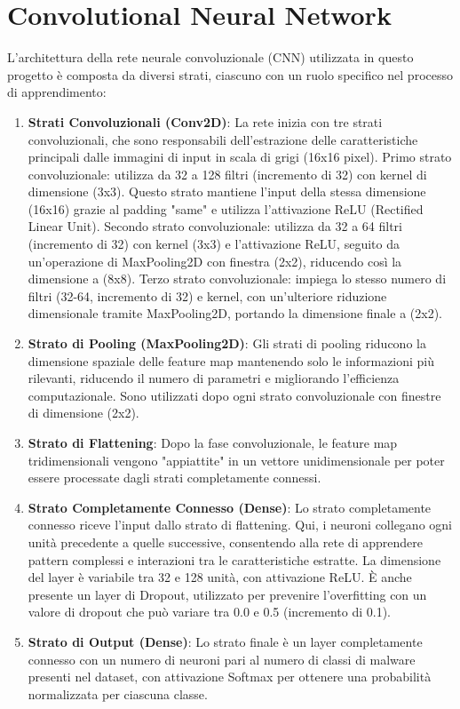 
\section{Convolutional Neural Network}
L'architettura della rete neurale convoluzionale (CNN) utilizzata in questo progetto è composta da diversi strati, ciascuno con un ruolo specifico nel processo di apprendimento:
\begin{enumerate}
    \item \textbf{Strati Convoluzionali (Conv2D)}:
    La rete inizia con tre strati convoluzionali, che sono responsabili dell'estrazione delle caratteristiche principali dalle immagini di input in scala di grigi (16x16 pixel).
    Primo strato convoluzionale: utilizza da 32 a 128 filtri (incremento di 32) con kernel di dimensione (3x3). Questo strato mantiene l'input della stessa dimensione (16x16) grazie al padding "same" e utilizza l'attivazione ReLU (Rectified Linear Unit).
    Secondo strato convoluzionale: utilizza da 32 a 64 filtri (incremento di 32) con kernel (3x3) e l'attivazione ReLU, seguito da un'operazione di MaxPooling2D con finestra (2x2), riducendo così la dimensione a (8x8).
    Terzo strato convoluzionale: impiega lo stesso numero di filtri (32-64, incremento di 32) e kernel, con un'ulteriore riduzione dimensionale tramite MaxPooling2D, portando la dimensione finale a (2x2).
    \item \textbf{Strato di Pooling (MaxPooling2D)}:
    Gli strati di pooling riducono la dimensione spaziale delle feature map mantenendo solo le informazioni più rilevanti, riducendo il numero di parametri e migliorando l'efficienza computazionale.
    Sono utilizzati dopo ogni strato convoluzionale con finestre di dimensione (2x2).
    \item \textbf{Strato di Flattening}:
    Dopo la fase convoluzionale, le feature map tridimensionali vengono "appiattite" in un vettore unidimensionale per poter essere processate dagli strati completamente connessi.
    \item \textbf{Strato Completamente Connesso (Dense)}:
    Lo strato completamente connesso riceve l'input dallo strato di flattening. Qui, i neuroni collegano ogni unità precedente a quelle successive, consentendo alla rete di apprendere pattern complessi e interazioni tra le caratteristiche estratte.
    La dimensione del layer è variabile tra 32 e 128 unità, con attivazione ReLU. È anche presente un layer di Dropout, utilizzato per prevenire l'overfitting con un valore di dropout che può variare tra 0.0 e 0.5 (incremento di 0.1).
    \item \textbf{Strato di Output (Dense)}:
    Lo strato finale è un layer completamente connesso con un numero di neuroni pari al numero di classi di malware presenti nel dataset, con attivazione Softmax per ottenere una probabilità normalizzata per ciascuna classe.
\end{enumerate}

